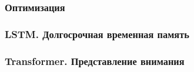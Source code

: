 

\subsubsection{Оптимизация}



\subsubsection{LSTM. Долгосрочная временная память}



\subsubsection{Transformer. Представление внимания}






